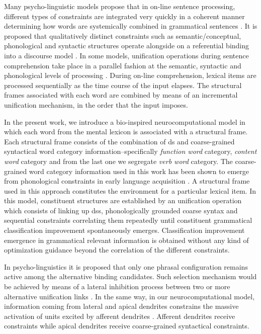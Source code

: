 {Many psycho-linguistic models propose that in on-line sentence processing, different types of constraints are integrated very quickly in a coherent manner determining how words are systemically combined in grammatical sentences \cite{Gibson1998-GIBCOS}. It is proposed that qualitatively distinct constraints such as semantic/conceptual, phonological and syntactic structures operate alongside on a referential binding into a discourse model \cite{Rego1993TheCB, 10.1371/journal.pone.0177794}. In some models, unification operations during sentence comprehension take place in a parallel fashion at the semantic, syntactic and phonological levels of processing \cite{Hagoort2005OnBB}. During on-line comprehension, lexical items are processed sequentially as the time course of the input elapses. The structural frames associated with each word are combined by means of an incremental unification mechanism, in the order that the input imposes.

In the present work, we introduce a bio-inspired neurocomputational model in which each word from the mental lexicon is associated with a structural frame. Each structural frame consists of the combination of \gls{ds} \cite{doi:10.1080/00437956.1954.11659520} and
coarse-grained syntactical word category information--specifically \emph{function word} category, \emph{content word} category and from the last one we segregate \emph{verb word} category.
The coarse-grained word category information used in this work has been shown to emerge from phonological constraints in early language acquisition \cite{doi:10.1207/s15327078in1002_5,lohmann_phonological_2017}.
A structural frame used in this approach constitutes the environment for a particular lexical item.
In this model, constituent structures are established by an unification operation which consists of linking up \glspl{ds},
phonologically grounded
coarse syntax and sequential constraints correlating them repeatedly until constituent grammatical classification improvement spontaneously emerges. Classification improvement emergence in grammatical relevant information is obtained without any kind of optimization guidance beyond the correlation of the different constraints.

In psycho-linguistics it is proposed that only one phrasal configuration remains active among the alternative binding candidates. Such selection mechanism would be achieved by means of a lateral inhibition process between two or more alternative unification links \cite{Hagoort2005OnBB}.
In the same way, in our neurocomputational model, information coming from lateral and apical dendrites constrains the massive activation of units excited by afferent dendrites \cite{10.1371/journal.pone.0217966}.
Afferent dendrites receive  constraints while apical dendrites receive coarse-grained syntactical constraints.

}
